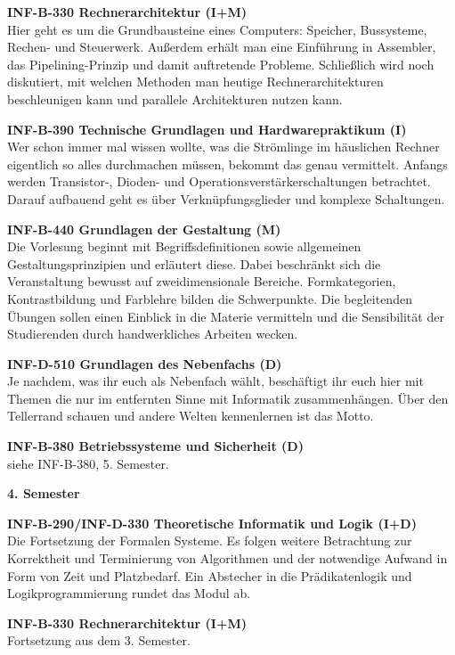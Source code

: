\textbf{INF-B-330 Rechnerarchitektur (I+M)} \\
Hier geht es um die Grundbausteine eines Computers:
Speicher, Bussysteme, Rechen- und Steuerwerk.
Außerdem erhält man eine Einführung in Assembler, das Pipelining-Prinzip und damit auftretende Probleme.
Schließlich wird noch diskutiert, mit welchen Methoden man heutige Rechnerarchitekturen beschleunigen kann und parallele Architekturen nutzen kann.

\textbf{INF-B-390 Technische Grundlagen und Hardwarepraktikum (I)} \\
Wer schon immer mal wissen wollte, was die Strömlinge im häuslichen Rechner eigentlich so alles durchmachen müssen, bekommt das genau vermittelt.
Anfangs werden Transistor-, Dioden- und Operationsverstärkerschaltungen betrachtet.
Darauf aufbauend geht es über Verknüpfungsglieder und komplexe Schaltungen.

\textbf{INF-B-440 Grundlagen der Gestaltung (M)} \\
Die Vorlesung beginnt mit Begriffsdefinitionen sowie allgemeinen Gestaltungsprinzipien und erläutert diese.
Dabei beschränkt sich die Veranstaltung bewusst auf zweidimensionale Bereiche.
Formkategorien, Kontrastbildung und Farblehre bilden die Schwerpunkte.
Die begleitenden Übungen sollen einen Einblick in die Materie vermitteln und die Sensibilität der Studierenden durch handwerkliches Arbeiten wecken.

\textbf{INF-D-510 Grundlagen des Nebenfachs (D)} \\
Je nachdem, was ihr euch als Nebenfach wählt, beschäftigt ihr euch hier mit Themen die nur im entfernten Sinne mit Informatik zusammenhängen.
Über den Tellerrand schauen und andere Welten kennenlernen ist das Motto.

\textbf{INF-B-380 Betriebssysteme und Sicherheit (D)} \\
siehe INF-B-380, 5. Semester.

\textbf{4. Semester}

\textbf{INF-B-290/INF-D-330 Theoretische Informatik und Logik (I+D)} \\
Die Fortsetzung der Formalen Systeme.
Es folgen weitere Betrachtung zur Korrektheit und Terminierung von Algorithmen und der notwendige Aufwand in Form von Zeit und Platzbedarf.
Ein Abstecher in die Prädikatenlogik und Logikprogrammierung rundet das Modul ab.

\textbf{INF-B-330 Rechnerarchitektur (I+M)} \\
Fortsetzung aus dem 3. Semester.

